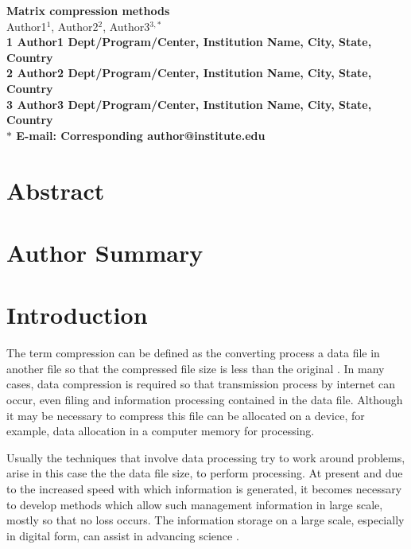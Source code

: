 \documentclass[10pt]{article}
\date{}
\begin{document}
\begin{flushleft}
{\Large
\textbf{Matrix compression methods}
}
\\
Author1$^{1}$, 
Author2$^{2}$, 
Author3$^{3,\ast}$
\\
\bf{1} Author1 Dept/Program/Center, Institution Name, City, State, Country
\\
\bf{2} Author2 Dept/Program/Center, Institution Name, City, State, Country
\\
\bf{3} Author3 Dept/Program/Center, Institution Name, City, State, Country
\\
$\ast$ E-mail: Corresponding author@institute.edu
\end{flushleft}

\section*{Abstract}

\section*{Author Summary}

\section*{Introduction}

The term compression can be defined as the converting process a data file in another file so that the compressed file size is less than the original \cite{salomon}. In many cases, data compression is required so that transmission process by internet can occur, even filing and information processing contained in the data file. Although it may be necessary to compress this file can be allocated on a device, for example, data allocation in a computer memory for processing.

Usually the techniques that involve data processing try to work around problems, 
arise in this case the the data file size, to perform processing. At present and 
due to the increased speed with which information is generated, it becomes 
necessary to develop methods which allow such management information in large 
scale, mostly so that no loss occurs. The information storage on a large scale, 
especially in digital form, can assist in advancing science \cite{lynch}.  
\end{document}
